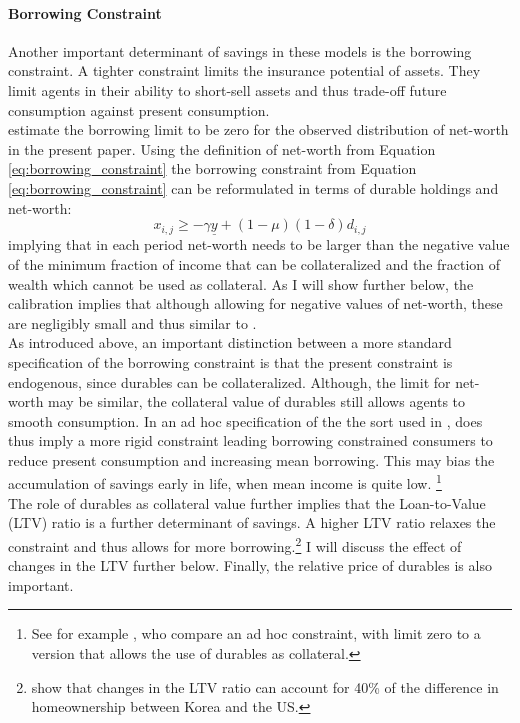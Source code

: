\documentclass[a4paper,12pt,legno]{article}
\begin{document}
\paragraph{Borrowing Constraint} Another important determinant of savings in these models is the borrowing constraint. A tighter constraint limits the insurance potential of assets. They limit agents in their ability to short-sell assets and thus trade-off future consumption against present consumption. \\ \cite{hintermaier2011} estimate the borrowing limit to be zero for the observed distribution of net-worth in the present paper. 
Using the definition of net-worth from Equation \ref{eq:borrowing_constraint} the borrowing constraint from Equation \ref{eq:borrowing_constraint} can be reformulated in terms of durable holdings and net-worth: 
\begin{equation}
x_{i,j} \geq -\gamma\underline{y}+(1-\mu)(1-\delta)d_{i,j}
\end{equation}
implying that in each period net-worth needs to be larger than the negative value of the minimum fraction of income that can be collateralized and the fraction of wealth which cannot be used as collateral. As I will show further below, the calibration implies that although allowing for negative values of net-worth, these are negligibly small and thus similar to \cite{hintermaier2011}. 
\\ 
As introduced above, an important distinction between a more standard specification of the borrowing constraint is that the present constraint is endogenous, since durables can be collateralized. Although, the limit for net-worth may be similar, the collateral value of durables still allows agents to smooth consumption. In an ad hoc specification of the the sort used in \cite{hintermaier2011}, does thus imply a more rigid constraint leading borrowing constrained consumers to reduce present consumption and increasing mean borrowing. This may bias the accumulation of savings early in life, when mean income is quite low. \footnote{See for example \cite{FV&K2011}, who compare an ad hoc constraint, with limit zero to a version that allows the use of durables as collateral.} \\ The role of durables as collateral value further implies that the Loan-to-Value (LTV) ratio is a further determinant of savings. A higher LTV ratio relaxes the constraint and thus allows for more borrowing.\footnote{\cite{cho2012accounting} show that changes in the LTV ratio can account for 40\% of the difference in homeownership between Korea and the US.} I will discuss the effect of changes in the LTV further below.
Finally, the relative price of durables is also important.
\end{document}
